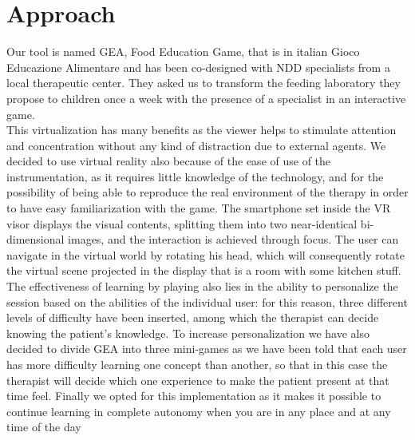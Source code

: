 \documentclass{sigchi-ext}
\begin{document}
\section{Approach}
Our tool is named GEA, Food Education Game, that is in italian Gioco Educazione Alimentare and has been co-designed with NDD specialists from a local therapeutic center. They asked us to transform the feeding laboratory they propose to children once a week with the presence of a specialist in an interactive game.\\
\medskip
 This virtualization has many benefits as the viewer helps to stimulate attention and concentration without any kind of distraction due to external agents. We decided to use virtual reality also because of the ease of use of the instrumentation, as it requires little knowledge of the technology, and for the possibility of being able to reproduce the real environment of the therapy in order to have easy familiarization with the game. The smartphone set inside the VR visor displays the visual contents, splitting them into two near-identical bi-dimensional images, and the interaction is achieved through focus. The user can navigate in the virtual world by rotating his head, which will consequently rotate the virtual scene projected in the display that is a room with some kitchen stuff.\\
\medskip
  The effectiveness of learning by playing also lies in the ability to personalize the session based on the abilities of the individual user: for this reason, three different levels of difficulty have been inserted, among which the therapist can decide knowing the patient's knowledge. To increase personalization we have also decided to divide GEA into three mini-games as we have been told that each user has more difficulty learning one concept than another, so that in this case the therapist will decide which one experience to make the patient present at that time feel. Finally we opted for this implementation as it makes it possible to continue learning in complete autonomy when you are in any place and at any time of the day
\end{document}
